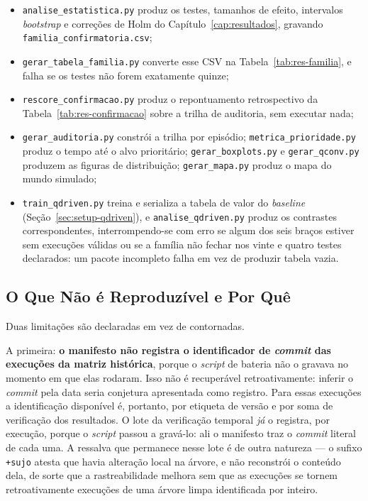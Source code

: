 \begin{itemize}
    \item \texttt{analise\_estatistica.py} produz os testes, tamanhos de efeito,
    intervalos \textit{bootstrap} e correções de Holm do
    Capítulo~\ref{cap:resultados}, gravando \texttt{familia\_confirmatoria.csv};
    \item \texttt{gerar\_tabela\_familia.py} converte esse CSV na
    Tabela~\ref{tab:res-familia}, e falha se os testes não forem exatamente quinze;
    \item \texttt{rescore\_confirmacao.py} produz o repontuamento retrospectivo da
    Tabela~\ref{tab:res-confirmacao} sobre a trilha de auditoria, sem executar nada;
    \item \texttt{gerar\_auditoria.py} constrói a trilha por episódio;
    \texttt{metrica\_prioridade.py} produz o tempo até o alvo prioritário;
    \texttt{gerar\_boxplots.py} e \texttt{gerar\_qconv.py} produzem as figuras de
    distribuição; \texttt{gerar\_mapa.py} produz o mapa do mundo simulado;
    \item \texttt{train\_qdriven.py} treina e serializa a tabela de valor do
    \textit{baseline} (Seção~\ref{sec:setup-qdriven}), e \texttt{analise\_qdriven.py}
    produz os contrastes correspondentes, interrompendo-se com erro se algum dos seis
    braços estiver sem execuções válidas ou se a família não fechar nos vinte e quatro
    testes declarados: um pacote incompleto falha em vez de produzir tabela vazia.
\end{itemize}

\subsection{O Que Não é Reproduzível e Por Quê}

Duas limitações são declaradas em vez de contornadas.

A primeira: \textbf{o manifesto não registra o identificador de \textit{commit} das
execuções da matriz histórica}, porque o \textit{script} de bateria não o gravava no
momento em que elas rodaram. Isso não é recuperável retroativamente: inferir o
\textit{commit} pela data seria conjetura apresentada como registro. Para essas
execuções a identificação disponível é, portanto, por etiqueta de versão e por soma de
verificação dos resultados. O lote da verificação temporal \emph{já} o registra, por
execução, porque o \textit{script} passou a gravá-lo: ali o manifesto traz o
\textit{commit} literal de cada uma. A ressalva que permanece nesse lote é de outra
natureza --- o sufixo \texttt{+sujo} atesta que havia alteração local na árvore, e não
reconstrói o conteúdo dela, de sorte que a rastreabilidade melhora sem que as execuções
se tornem retroativamente execuções de uma árvore limpa identificada por inteiro.

